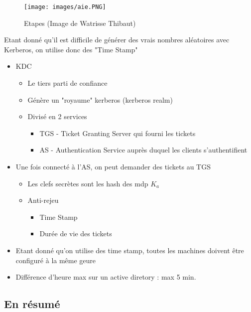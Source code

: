 \documentclass[a4paper]{article}
\begin{document}
      \begin{figure}[H]
        \centering
        \texttt{[image: images/aie.PNG]}
        \caption{Etapes (Image de Watrisse Thibaut)}
      \end{figure}

      Etant donné qu'il est difficile de générer des vrais nombres aléatoires avec Kerberos, on utilise donc des "Time Stamp"

      \begin{itemize}[label = \textbullet, font = \Large]
        \item KDC
        \begin{itemize}[label=, font=\scriptsize]
          \item Le tiers parti de confiance
          \item Génère un "royaume" kerberos (kerberos realm)
          \item Divisé en 2 services
          \begin{itemize}
            \item TGS - Ticket Granting Server qui fourni les tickets
            \item AS - Authentication Service auprès duquel les clients s'authentifient
          \end{itemize}
        \end{itemize}
        \item Une fois connecté à l'AS, on peut demander des tickets au TGS
        \begin{itemize}[label=, font=\scriptsize]
          \item Les clefs secrètes sont les hash des mdp $K_a$
          \item Anti-rejeu
          \begin{itemize}
            \item Time Stamp
            \item Durée de vie des tickets
          \end{itemize}
        \end{itemize}
        \item Etant donné qu'on utilise des time stamp, toutes les machines doivent être configuré à la même geure
        \item Différence d'heure max sur un active diretory : max 5 min.
      \end{itemize}

      \subsection{En résumé}
\end{document}
